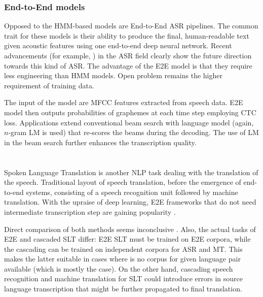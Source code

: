 \subsubsection{End-to-End models}
Opposed to the HMM-based models are End-to-End ASR pipelines. The common trait for these models is their ability to produce the final, human-readable text given acoustic features using one end-to-end deep neural network. Recent advancements (for example, ) in the ASR field clearly show the future direction towards this kind of ASR. The advantage of the E2E model is that they require less engineering than HMM models. Open problem remains the higher requirement of training data.

The input of the model are MFCC features extracted from speech data. E2E model then outputs probabilities of graphemes at each time step employing CTC loss. Applications extend conventional beam search with language model (again, $n$-gram LM is used) that re-scores the beams during the decoding. The use of LM in the beam search further enhances the transcription quality.

\pagebreak
\section{}
Spoken Language Translation is another NLP task dealing with the translation of the speech.  Traditional layout of speech translation, before the emergence of end-to-end systems, consisting of a speech recognition unit followed by machine translation. With the upraise of deep learning, E2E frameworks that do not need intermediate transcription step are gaining popularity .

Direct comparison of both methods seems inconclusive . Also, the actual tasks of E2E and cascaded SLT differ: E2E SLT must be trained on E2E corpora, while the cascading can be trained on independent corpora for ASR and MT. This makes the latter suitable in cases where is no corpus for given language pair available (which is mostly the case). On the other hand, cascading speech recognition and machine translation for SLT could introduce errors in source language transcription that might be further propagated to final translation.

